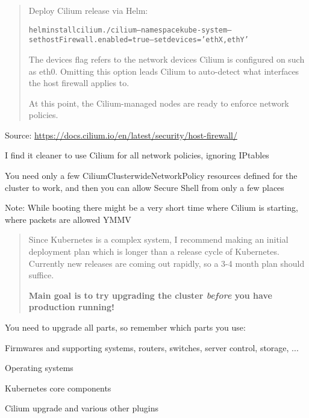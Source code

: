 \documentclass[Screen16to9,17pt]{foils}
\begin{document}


\begin{quote}
Deploy Cilium release via Helm:

\begin{alltt}\footnotesize
helm install cilium ./cilium   --namespace kube-system  --set hostFirewall.enabled=true    --set devices='{ethX,ethY}'
\end{alltt}
The devices flag refers to the network devices Cilium is configured on such as eth0. Omitting this option leads Cilium to auto-detect what interfaces the host firewall applies to.

At this point, the Cilium-managed nodes are ready to enforce network policies.

\end{quote}
Source: \url{https://docs.cilium.io/en/latest/security/host-firewall/}


\begin{list2}
\item I find it cleaner to use Cilium for all network policies, ignoring IPtables
\item You need only a few CiliumClusterwideNetworkPolicy resources defined for the cluster to work, and then you can allow Secure Shell from only a few places
\item Note: While booting there might be a very short time where Cilium is starting, where packets are allowed YMMV
\end{list2}





\begin{quote}
Since Kubernetes is a complex system, I recommend making an initial deployment plan which is longer than a release cycle of Kubernetes. Currently new releases are coming out rapidly, so a 3-4 month plan should suffice.

{\bf Main goal is to try upgrading the cluster \emph{before} you have production running!}
\end{quote}


You need to upgrade all parts, so remember which parts you use:
\begin{list2}
\item Firmwares and supporting systems, routers, switches, server control, storage, ...
\item Operating systems
\item Kubernetes core components
\item Cilium upgrade and various other plugins
\end{list2}
\end{document}
